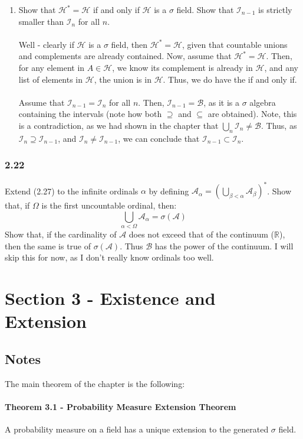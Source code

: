 \documentclass[12pt,a4paper]{article}
\newcommand{\1}[1]{\mathbbm{1}\left\{ #1 \right\}}
\newcommand{\R}{\mathbb{R}}
\newcommand{\acal}{\mathcal{A}}
\newcommand{\ical}{\mathcal{I}}
\newcommand{\bcal}{\mathcal{B}}
\newcommand{\hcal}{\mathcal{H}}
\begin{document}
\begin{enumerate}
	\item Show that $\hcal^* = \hcal$ if and only if $\hcal$ is a $\sigma$ field. Show that $\ical_{n-1}$ is strictly smaller than $\ical_n$ for all $n$.
	\\\\
	Well - clearly if $\hcal$ is a $\sigma$ field, then $\hcal^* = \hcal$, given that countable unions and complements are already contained. Now, assume that $\hcal^* = \hcal$. Then, for any element in $A \in \hcal$, we know its complement is already in $\hcal$, and any list of elements in $\hcal$, the union is in $\hcal$. Thus, we do have the if and only if.
	\\\\
	Assume that $\ical_{n-1} = \ical_n$ for all $n$. Then, $\ical_{n-1} = \bcal$, as it is a $\sigma$ algebra containing the intervals (note how both $\supseteq$ and $\subseteq$ are obtained). Note, this is a contradiction, as we had shown in the chapter that $\bigcup_n \ical_n \neq \bcal$. Thus, as $\ical_n \supseteq \ical_{n-1}$, and $\ical_n \neq \ical_{n-1}$, we can conclude that $\ical_{n-1} \subset \ical_n$. 
\end{enumerate}

\subsubsection{2.22} Extend (2.27) to the infinite ordinals $\alpha$ by defining $\acal_\alpha = \left(\bigcup_{\beta < \alpha} \acal_\beta\right)^*$. Show that, if $\Omega$ is the first uncountable ordinal, then:
$$
	\bigcup_{\alpha < \Omega} \acal_\alpha = \sigma(\acal)
$$
Show that, if the cardinality of $\acal$ does not exceed that of the continuum ($\R$), then the same is true of $\sigma(\acal)$. Thus $\bcal$ has the power of the continuum. I will skip this for now, as I don't really know ordinals too well.


\section{Section 3 - Existence and Extension}
\subsection{Notes}
The main theorem of the chapter is the following:

\paragraph{Theorem 3.1 - Probability Measure Extension Theorem} A probability measure on a field has a unique extension to the generated $\sigma$ field.
\end{document}
